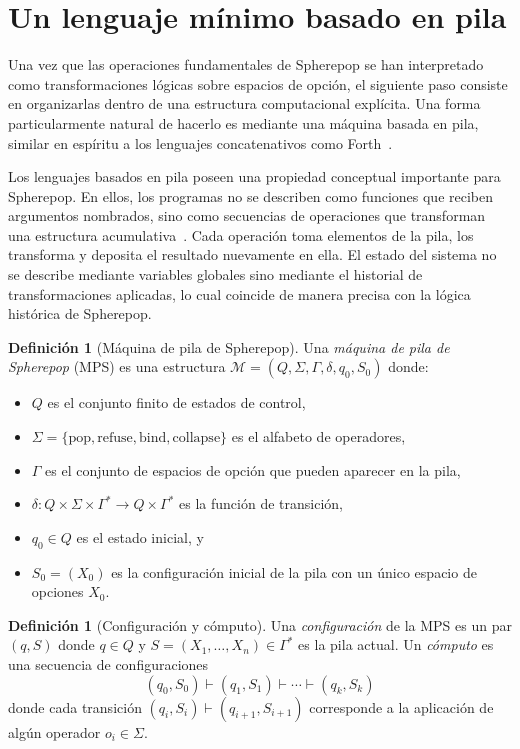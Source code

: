 \documentclass[12pt]{article}
\theoremstyle{plain}
\theoremstyle{definition}
\newtheorem{definition}[theorem]{Definición}
\begin{document}
\section{Un lenguaje mínimo basado en pila}
\label{sec:pila}

Una vez que las operaciones fundamentales de Spherepop se han interpretado como transformaciones lógicas sobre espacios de opción, el siguiente paso consiste en organizarlas dentro de una estructura computacional explícita. Una forma particularmente natural de hacerlo es mediante una máquina basada en pila, similar en espíritu a los lenguajes concatenativos como Forth~\cite{moore,okasaki,turner}.

Los lenguajes basados en pila poseen una propiedad conceptual importante para Spherepop. En ellos, los programas no se describen como funciones que reciben argumentos nombrados, sino como secuencias de operaciones que transforman una estructura acumulativa~\cite{moore}. Cada operación toma elementos de la pila, los transforma y deposita el resultado nuevamente en ella. El estado del sistema no se describe mediante variables globales sino mediante el historial de transformaciones aplicadas, lo cual coincide de manera precisa con la lógica histórica de Spherepop.

\begin{definition}[Máquina de pila de Spherepop]
\label{def:maquina_pila}
Una \emph{máquina de pila de Spherepop} (MPS) es una estructura $\mathcal{M} = (Q, \Sigma, \Gamma, \delta, q_0, S_0)$ donde:
\begin{itemize}
\item[] $Q$ es el conjunto finito de estados de control,
\item[] $\Sigma = \{\mathrm{pop}, \mathrm{refuse}, \mathrm{bind}, \mathrm{collapse}\}$ es el alfabeto de operadores,
\item[] $\Gamma$ es el conjunto de espacios de opción que pueden aparecer en la pila,
\item[] $\delta: Q \times \Sigma \times \Gamma^* \to Q \times \Gamma^*$ es la función de transición,
\item[] $q_0 \in Q$ es el estado inicial, y
\item[] $S_0 = (X_0)$ es la configuración inicial de la pila con un único espacio de opciones $X_0$.
\end{itemize}
\end{definition}

\begin{definition}[Configuración y cómputo]
\label{def:computo}
Una \emph{configuración} de la MPS es un par $(q, S)$ donde $q \in Q$ y $S = (X_1, \ldots, X_n) \in \Gamma^*$ es la pila actual. Un \emph{cómputo} es una secuencia de configuraciones
\[
(q_0, S_0) \vdash (q_1, S_1) \vdash \cdots \vdash (q_k, S_k)
\]
donde cada transición $(q_i, S_i) \vdash (q_{i+1}, S_{i+1})$ corresponde a la aplicación de algún operador $o_i \in \Sigma$.
\end{definition}
\end{document}
